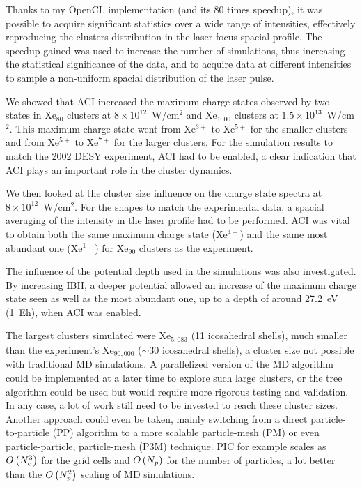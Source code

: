 Thanks to my OpenCL implementation (and its 80 times speedup), it was possible
to acquire significant statistics over a wide range of intensities, effectively
reproducing the clusters distribution in the laser focus spacial profile. The
speedup gained was used to increase the number of simulations, thus increasing
the statistical significance of the data, and to acquire data at different
intensities to sample a non-uniform spacial distribution of the laser pulse.

We showed that ACI increased the maximum charge states observed by two states in
Xe$_{80}$ clusters at $8\times10^{12}$~W/cm$^2$ and Xe$_{1000}$ clusters
at $1.5\times10^{13}$~W/cm$^2$. This maximum charge state went from Xe$^{3+}$ to
Xe$^{5+}$ for the smaller clusters and from Xe$^{5+}$ to Xe$^{7+}$ for the
larger clusters. For the simulation results to match the 2002 DESY experiment,
ACI had to be enabled, a clear indication that ACI plays an important role in
the cluster dynamics.

We then looked at the cluster size influence on the charge state spectra
at $8\times10^{12}$~W/cm$^2$. For the shapes to match the
experimental data, a spacial averaging of the intensity in the laser profile
had to be performed. ACI was vital to obtain both the same maximum charge state
(Xe$^{4+}$) and the same most abundant one (Xe$^{1+}$) for Xe$_{90}$ clusters
as the experiment.

The influence of the potential depth used in the simulations was also
investigated. By increasing IBH, a deeper potential allowed an increase of the
maximum charge state seen as well as the most abundant one, up to a depth
of around 27.2~eV (1~Eh), when ACI was enabled.

The largest clusters simulated were Xe$_{5,083}$ (11
icosahedral shells), much smaller than the experiment's Xe$_{90,000}$
($\sim$30 icosahedral shells), a
cluster size not possible with traditional MD simulations. A parallelized
version of the MD algorithm could be implemented at a later time to explore such
large clusters, or the tree algorithm could be used but would require more
rigorous testing and validation. In any case, a lot of work still need to be
invested to reach these cluster sizes. Another approach could even be taken,
mainly switching from a direct particle-to-particle (PP) algorithm to a more
scalable particle-mesh (PM) or even particle-particle, particle-mesh (P3M)
technique. PIC for example scales as $O\left( N_c^3 \right)$ for the grid cells and
$O\left( N_p \right)$ for the number of particles, a lot better than the $O\left( N_p^2 \right)$
scaling of MD simulations.



